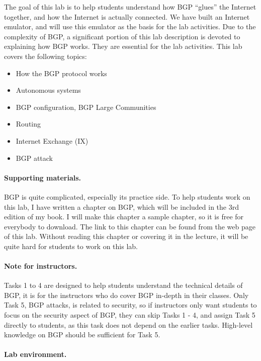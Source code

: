 The goal of this lab is to help students understand how
BGP ``glues'' the Internet together, and how the Internet is actually
connected. We have built an Internet emulator, and will 
use this emulator as the basis for the lab activities. Due to the 
complexity of BGP, a significant portion of this lab description 
is devoted to explaining how BGP works. They are 
essential for the lab activities. 
This lab covers the following topics:
\begin{itemize}[noitemsep]
\item How the BGP protocol works
\item Autonomous systems
\item BGP configuration, BGP Large Communities 
\item Routing 
\item Internet Exchange (IX)
\item BGP attack
\end{itemize}


\paragraph{Supporting materials.}
BGP is quite complicated, especially its practice side.
To help students work on this lab, I have written a chapter on
BGP, which will be included in the 3rd edition of my book.
I will make this chapter a sample chapter, so it is free
for everybody to download. 
The link to this chapter can be found from the web page of this lab.
Without reading this chapter
or covering it in the lecture, it will be quite hard 
for students to work on this lab. 


\paragraph{Note for instructors.} 
Tasks 1 to 4 are designed to help students understand the technical 
details of BGP, it is for the instructors who do cover BGP in-depth in
their classes. Only Task 5, BGP attacks, is related to security,
so if instructors only want students to
focus on the security aspect of BGP, they can skip Tasks 1 - 4, and 
assign Task 5 directly to students, as this task
does not depend on the earlier tasks. 
High-level knowledge on BGP should be sufficient for Task 5.

\paragraph{Lab environment.} 
\seedenvironmentB
\nodependency



